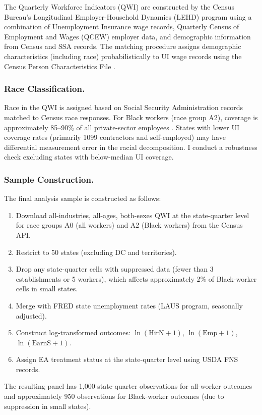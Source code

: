 \documentclass[12pt]{article}
\begin{document}
The Quarterly Workforce Indicators (QWI) are constructed by the Census Bureau's Longitudinal Employer-Household Dynamics (LEHD) program using a combination of Unemployment Insurance wage records, Quarterly Census of Employment and Wages (QCEW) employer data, and demographic information from Census and SSA records. The matching procedure assigns demographic characteristics (including race) probabilistically to UI wage records using the Census Person Characteristics File .

\subsubsection*{Race Classification.} Race in the QWI is assigned based on Social Security Administration records matched to Census race responses. For Black workers (race group A2), coverage is approximately 85--90\% of all private-sector employees . States with lower UI coverage rates (primarily 1099 contractors and self-employed) may have differential measurement error in the racial decomposition. I conduct a robustness check excluding states with below-median UI coverage.

\subsubsection*{Sample Construction.} The final analysis sample is constructed as follows:
\begin{enumerate}
    \item Download all-industries, all-ages, both-sexes QWI at the state-quarter level for race groups A0 (all workers) and A2 (Black workers) from the Census API.
    \item Restrict to 50 states (excluding DC and territories).
    \item Drop any state-quarter cells with suppressed data (fewer than 3 establishments or 5 workers), which affects approximately 2\% of Black-worker cells in small states.
    \item Merge with FRED state unemployment rates (LAUS program, seasonally adjusted).
    \item Construct log-transformed outcomes: $\ln(\text{HirN}+1)$, $\ln(\text{Emp}+1)$, $\ln(\text{EarnS}+1)$.
    \item Assign EA treatment status at the state-quarter level using USDA FNS records.
\end{enumerate}

The resulting panel has 1,000 state-quarter observations for all-worker outcomes and approximately 950 observations for Black-worker outcomes (due to suppression in small states).
\end{document}
